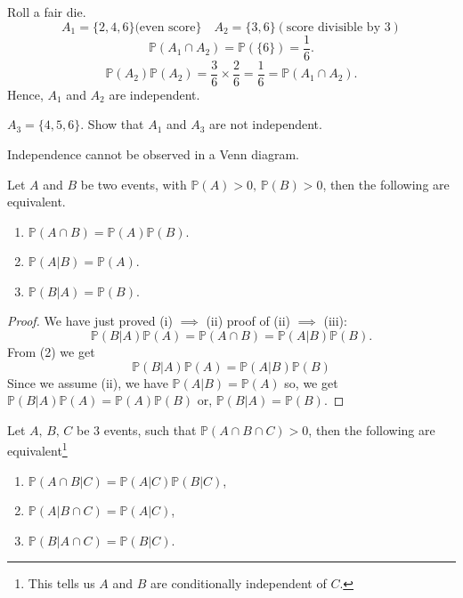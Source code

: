 \documentclass[10pt, a4paper]{article}
\begin{document}
\begin{example}
    Roll a fair die.
    \[
    A_1 = \{2, 4, 6\}(\text{even score}\}\quad A_2 = \{3, 6\}(\text{score divisible by $3$})
    \]
    \[
    \mathbb{P}(A_1 \cap A_2) = \mathbb{P}(\{6\}) = \frac{1}{6}.
    \]
    \[
    \mathbb{P}(A_2)\mathbb{P}(A_2) = \frac{3}{6} \times \frac{2}{6} = \frac{1}{6} = \mathbb{P}(A_1 \cap A_2).
    \]
     Hence, $A_1$ and $A_2$ are independent.

     $A_3 = \{4, 5, 6\}$. Show that $A_1$ and $A_3$ are not independent.
\end{example}

Independence cannot be observed in a Venn diagram.

\begin{theorem}
    Let $A$ and $B$ be two events, with $\mathbb{P}(A) > 0,\,\mathbb{P}(B) > 0$, then the following are equivalent.
    \begin{enumerate}[label = (\roman*)]
        \item $\mathbb{P}(A \cap B) = \mathbb{P}(A)\mathbb{P}(B)$.
        \item $\mathbb{P}(A | B) = \mathbb{P}(A)$.
        \item $\mathbb{P}(B | A) = \mathbb{P}(B)$.
    \end{enumerate}
    \begin{proof}
        We have just proved (i) $\implies$ (ii)    
        proof of (ii) $\implies$ (iii):
        \begin{equation}
        \mathbb{P}(B | A)\mathbb{P}(A) = \mathbb{P}(A \cap B) = \mathbb{P}(A | B)\mathbb{P}(B).
        \end{equation}
        From (2) we get
        \[
        \mathbb{P}(B | A)\mathbb{P}(A) = \mathbb{P}(A | B)\mathbb{P}(B)
        \]
        Since we assume (ii), we have $\mathbb{P}(A | B) = \mathbb{P}(A)$ so,  we get $\mathbb{P}(B | A)\mathbb{P}(A) = \mathbb{P}(A)\mathbb{P}(B)$ or, $\mathbb{P}(B | A) = \mathbb{P}(B)$.
    \end{proof}
\end{theorem}

\begin{theorem}
    Let $A,\, B,\, C$ be $3$ events, such that $\mathbb{P}(A \cap B \cap C) > 0$, then the following are equivalent\footnote{This tells us $A$ and $B$ are conditionally independent of $C$.}
    \begin{enumerate}[label = (\roman*)]
        \item $\mathbb{P}(A \cap B | C) = \mathbb{P}(A | C)\mathbb{P}(B | C)$,
        \item $\mathbb{P}(A | B \cap C) = \mathbb{P}(A | C)$,
        \item $\mathbb{P}(B | A \cap C) = \mathbb{P}(B | C)$.
    \end{enumerate}
\end{theorem}
\end{document}

